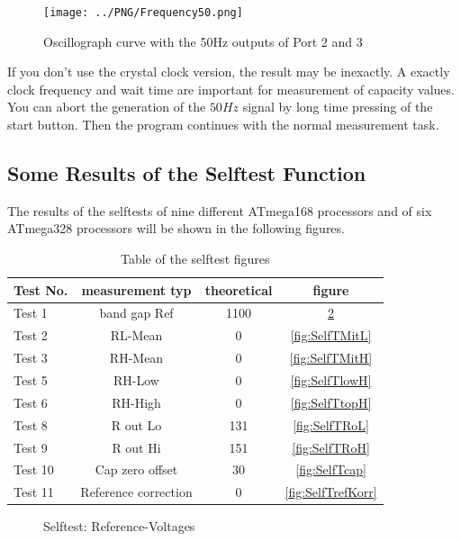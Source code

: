 \begin{figure}[H]
\centering
\texttt{[image: ../PNG/Frequency50.png]}
\caption{Oscillograph curve with the 50Hz outputs of Port 2 and 3}
\label{fig:Frequency50}
\end{figure}


If you don't use the crystal clock version, the result may be inexactly.
A exactly clock frequency and wait time are important for measurement of capacity values.
You can abort the generation of the \(50Hz\) signal by long time pressing of the start button.
Then the program continues with the normal measurement task.

\subsection{Some Results of the Selftest Function}

The results of the selftests of nine different ATmega168 processors and of six ATmega328 processors
will be shown in the following figures.

\begin{table}[H]
  \begin{center}
    \begin{tabular}{| l | c | c | c |}
    \hline
Test No. & measurement typ & theoretical & figure \\
    \hline
    \hline
Test 1 & band gap Ref  & 1100 & \ref{fig:SelfTref} \\
    \hline
Test 2 & RL-Mean & 0 & \ref{fig:SelfTMitL} \\
    \hline
Test 3 & RH-Mean & 0 & \ref{fig:SelfTMitH} \\
    \hline
Test 5 & RH-Low &  0 & \ref{fig:SelfTlowH} \\
    \hline
Test 6 & RH-High & 0 & \ref{fig:SelfTtopH} \\
    \hline
Test 8 & R out Lo & 131 & \ref{fig:SelfTRoL} \\
    \hline
Test 9 & R out Hi & 151 & \ref{fig:SelfTRoH} \\
    \hline
Test 10 & Cap zero offset & 30 & \ref{fig:SelfTcap} \\
    \hline
Test 11 & Reference correction & 0 & \ref{fig:SelfTrefKorr} \\
    \hline
    \end{tabular}
  \end{center}
  \caption{Table of the selftest figures }
  \label{tab:test_m168} 
\end{table}

\begin{figure}[H]
\centering

\caption{Selftest: Reference-Voltages}
\label{fig:SelfTref}
\end{figure}



